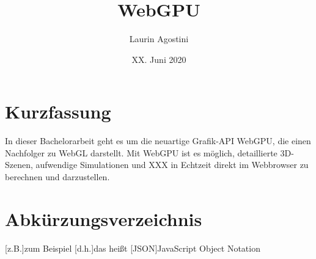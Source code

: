 \documentclass[oneside]{ausarbeitung}
\begin{document}



\title{WebGPU}

\author{Laurin Agostini}

\date{XX. Juni 2020}

\maketitle
\cleardoublepage

\setcounter{page}{1}


\makeaffirmation
\cleardoublepage

\chapter*{Kurzfassung}
In dieser Bachelorarbeit geht es um die neuartige Grafik-API WebGPU, die einen Nachfolger zu WebGL darstellt. Mit WebGPU ist es möglich, detaillierte 3D-Szenen, aufwendige Simulationen und XXX in Echtzeit direkt im Webbrowser zu berechnen und darzustellen. 

\cleardoublepage
{}
\tableofcontents

\listoffigures

\listoftables

\chapter*{Abkürzungsverzeichnis}
\begin{acronym}[JSON]  %

[z.B.]{zum Beispiel}
[d.h.]{das heißt}
[JSON]{JavaScript Object Notation}
\end{acronym}
\cleardoublepage
{}
\setcounter{page}{1}
\end{document}
